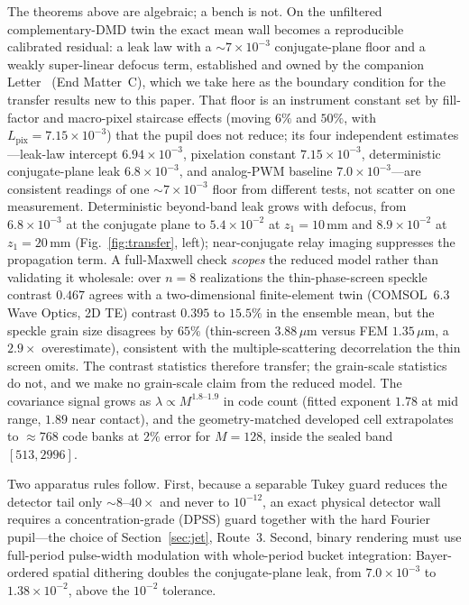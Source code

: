 \documentclass[10pt,twocolumn]{article}
\theoremstyle{plain}
\theoremstyle{definition}
\begin{document}
The theorems above are algebraic; a bench is not. On the unfiltered
complementary-DMD twin the exact mean wall becomes a reproducible calibrated
residual: a leak law with a $\sim\!7\times10^{-3}$ conjugate-plane floor and a
weakly super-linear defocus term, established and owned by the companion
Letter~\cite{COMPANION} (End Matter~C), which we take here as the boundary condition
for the transfer results new to this paper. That floor is an instrument constant set
by fill-factor and macro-pixel staircase effects (moving $6\%$ and $50\%$, with
$L_{\mathrm{pix}}=7.15\times10^{-3}$) that the pupil does not reduce; its four
independent estimates---leak-law intercept $6.94\times10^{-3}$, pixelation constant
$7.15\times10^{-3}$, deterministic conjugate-plane leak $6.8\times10^{-3}$, and
analog-PWM baseline $7.0\times10^{-3}$---are consistent readings of one
$\sim\!7\times10^{-3}$ floor from different tests, not scatter on one measurement.
Deterministic beyond-band leak grows with defocus, from $6.8\times10^{-3}$ at the
conjugate plane to $5.4\times10^{-2}$ at $z_1=10\,$mm and $8.9\times10^{-2}$ at
$z_1=20\,$mm (Fig.~\ref{fig:transfer}, left); near-conjugate relay imaging suppresses
the propagation term. A full-Maxwell check \emph{scopes} the reduced model rather
than validating it wholesale: over $n=8$ realizations the thin-phase-screen speckle
contrast $0.467$ agrees with a two-dimensional finite-element twin (COMSOL~6.3 Wave
Optics, 2D TE) contrast $0.395$ to $15.5\%$ in the ensemble mean, but the speckle
grain size disagrees by $65\%$ (thin-screen $3.88\,\mu$m versus FEM $1.35\,\mu$m, a
$2.9\times$ overestimate), consistent with the multiple-scattering decorrelation the
thin screen omits. The contrast statistics therefore transfer; the grain-scale
statistics do not, and we make no grain-scale claim from the reduced model. The
covariance signal grows as $\lambda\propto M^{1.8\text{--}1.9}$ in code count (fitted
exponent $1.78$ at mid range, $1.89$ near contact), and the geometry-matched
developed cell extrapolates to $\approx768$ code banks at $2\%$ error for $M=128$,
inside the sealed band $[513,2996]$.

Two apparatus rules follow. First, because a separable Tukey guard reduces the
detector tail only $\sim8$--$40\times$ and never to $10^{-12}$, an exact physical
detector wall requires a concentration-grade (DPSS) guard together with the hard
Fourier pupil---the choice of Section~\ref{sec:jet}, Route~3. Second, binary
rendering must use full-period pulse-width modulation with whole-period bucket
integration: Bayer-ordered spatial dithering doubles the conjugate-plane leak, from
$7.0\times10^{-3}$ to $1.38\times10^{-2}$, above the $10^{-2}$ tolerance.
\end{document}
